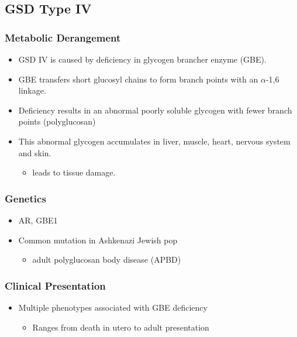 \documentclass{scrartcl}
\begin{document}
\subsection{GSD Type IV}
\label{sec:org4090e59}
\subsubsection{Metabolic Derangement}
\label{sec:orgb946b48}
\begin{itemize}
\item GSD IV is caused by deficiency in glycogen brancher enzyme (GBE).
\item GBE transfers short glucosyl chains to form branch points with an
\(\alpha\)-1,6 linkage.
\item Deficiency results in an abnormal poorly soluble glycogen with fewer branch points (polyglucosan)
\item This abnormal glycogen accumulates in liver, muscle, heart, nervous system and skin.
\begin{itemize}
\item leads to tissue damage.
\end{itemize}
\end{itemize}

\subsubsection{Genetics}
\label{sec:org7ffc653}
\begin{itemize}
\item AR, GBE1
\item Common mutation in Ashkenazi Jewish pop
\begin{itemize}
\item adult polyglucosan body disease (APBD)
\end{itemize}
\end{itemize}

\subsubsection{Clinical Presentation}
\label{sec:org3e2036c}

\begin{itemize}
\item Multiple phenotypes associated with GBE deficiency
\begin{itemize}
\item Ranges from death in utero to adult presentation
\end{itemize}
\end{itemize}
\end{document}
